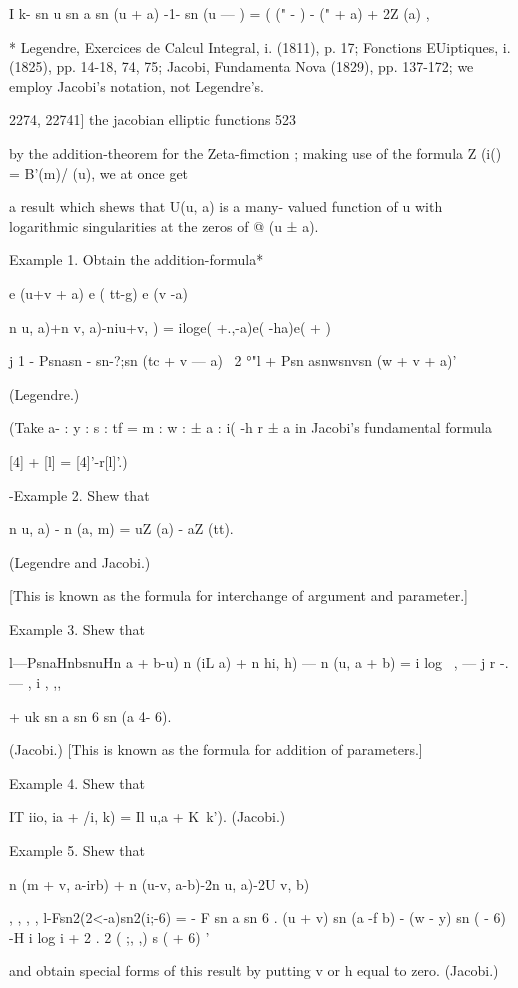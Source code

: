 I k- sn u sn a sn (u + a) -1- sn (u — ) = ( (" - ) - (" + a) + 2Z (a)
,

* Legendre, Exercices de Calcul Integral, i. (1811), p. 17; Fonctions
EUiptiques, i. (1825), pp. 14-18, 74, 75; Jacobi, Fundamenta Nova
(1829), pp. 137-172; we employ Jacobi's notation, not Legendre's.

2274, 22741] the jacobian elliptic functions 523

by the addition-theorem for the Zeta-fimction ; making use of the
formula Z (i() = B'(m)/ (u), we at once get

a result which shews that U(u, a) is a many- valued function of u with
logarithmic singularities at the zeros of @ (u ± a).

Example 1. Obtain the addition-formula*

e (u+v + a) e ( tt-g) e (v -a)

n u, a)+n v, a)-niu+v, ) = iloge( +.,-a)e( -ha)e( + )

j 1 - Psnasn - sn-?;sn (tc + v — a) ~2 °"l + Psn asnwsnvsn (w + v +
a)'

(Legendre.)

(Take a- : y : s : tf = m : w : ± a : i( -h r ± a in Jacobi's
fundamental formula

[4] + [l] = [4]'-r[l]'.)

-Example 2. Shew that

n u, a) - n (a, m) = uZ (a) - aZ (tt).

(Legendre and Jacobi.)

[This is known as the formula for interchange of argument and
parameter.]

Example 3. Shew that

l—PsnaHnbsnuHn a + b-u) n (iL a) + n hi, h) — n (u, a + b) = i log \ ,
— j r -. — , i , ,,\

+ uk sn a sn 6 sn (a 4- 6).

(Jacobi.) [This is known as the formula for addition of parameters.]

Example 4. Shew that

IT iio, ia + /i, k) = Il u,a + K\ k'). (Jacobi.)

Example 5. Shew that

n (m + v, a-irb) + n (u-v, a-b)-2n u, a)-2U v, b)

, , , , l-Fsn2(2<-a)sn2(i;-6) = - F sn a sn 6 . (u + v) sn (a -f b) -
(w - y) sn ( - 6) -H i log i + 2 . 2 ( ;, ,) s ( + 6) '

and obtain special forms of this result by putting v or h equal to
zero. (Jacobi.)

